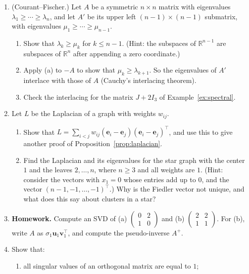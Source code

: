 \documentclass[11pt]{article}
\newcommand{\homework}{\textcolor{red!70!black}{\textbf{Homework.}}}
\theoremstyle{definition}
\theoremstyle{plain}
\theoremstyle{remark}
\begin{document}
\begin{enumerate}[leftmargin=*]
\begin{enumerate}
    \end{enumerate}
    \item (Courant--Fischer.) Let $A$ be a symmetric $n \times n$ matrix with eigenvalues $\lambda_1 \geq \cdots \geq \lambda_n$, and let $A'$ be its upper left $(n - 1) \times (n - 1)$ submatrix, with eigenvalues $\mu_1 \geq \cdots \geq \mu_{n-1}$.
    \begin{enumerate}
        \item Show that $\lambda_k \geq \mu_k$ for $k \leq n - 1$. (Hint: the subspaces of $\mathbb{R}^{n-1}$ are subspaces of $\mathbb{R}^n$ after appending a zero coordinate.)
        \item Apply (a) to $-A$ to show that $\mu_k \geq \lambda_{k+1}$. So the eigenvalues of $A'$ interlace with those of $A$ (Cauchy's interlacing theorem).
        \item Check the interlacing for the matrix $J + 2I_3$ of Example~\ref{ex:spectral}.
    \end{enumerate}
    \item Let $L$ be the Laplacian of a graph with weights $w_{ij}$.
    \begin{enumerate}
        \item Show that $L = \sum_{i < j} w_{ij}(\mathbf{e}_i - \mathbf{e}_j)(\mathbf{e}_i - \mathbf{e}_j)^\top$, and use this to give another proof of Proposition~\ref{prop:laplacian}.
        \item Find the Laplacian and its eigenvalues for the star graph with the center $1$ and the leaves $2, \ldots, n$, where $n \geq 3$ and all weights are $1$. (Hint: consider the vectors with $x_1 = 0$ whose entries add up to $0$, and the vector $(n - 1, -1, \ldots, -1)^\top$.) Why is the Fiedler vector not unique, and what does this say about clusters in a star?
    \end{enumerate}
    \item \homework{} Compute an SVD of (a) $\begin{pmatrix} 0 & 2 \\ 1 & 0 \end{pmatrix}$ and (b) $\begin{pmatrix} 2 & 2 \\ 1 & 1 \end{pmatrix}$. For (b), write $A$ as $\sigma_1 \mathbf{u}_1 \mathbf{v}_1^\top$, and compute the pseudo-inverse $A^+$.
    \item Show that:
    \begin{enumerate}[label=(\alph*)]
        \item all singular values of an orthogonal matrix are equal to $1$;

\end{enumerate}
\end{enumerate}
\end{document}

